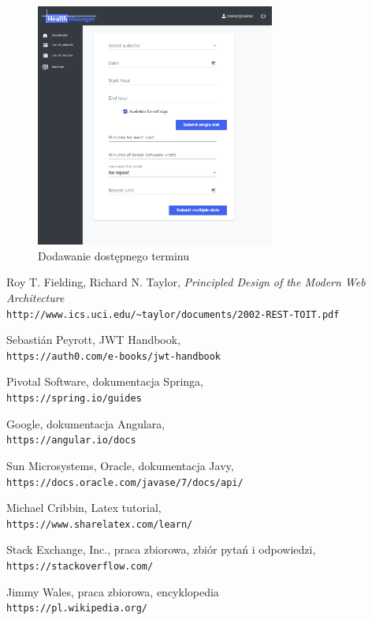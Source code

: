 \documentclass[polish,12pt]{aghthesis}
\begin{document}
{\begin{figure}[H]
          \includegraphics[width=0.7\textwidth]{gui-add-timeslot}
          \caption{Dodawanie dostępnego terminu}
        \end{figure}     
    }
\newpage
\listoffigures 
\newpage



\begin{thebibliography}{9}
Roy T. Fielding, Richard N. Taylor, \emph{Principled Design of the Modern
Web Architecture}
\\\texttt{http://www.ics.uci.edu/\~{}taylor/documents/2002-REST-TOIT.pdf}

Sebastián Peyrott, JWT Handbook, 
\\\texttt{https://auth0.com/e-books/jwt-handbook}

Pivotal Software, dokumentacja Springa, 
\\\texttt{https://spring.io/guides}

Google, dokumentacja Angulara, 
\\\texttt{https://angular.io/docs}

Sun Microsystems, Oracle, dokumentacja Javy, 
\\\texttt{https://docs.oracle.com/javase/7/docs/api/}
 
Michael Cribbin, Latex tutorial,
\\\texttt{https://www.sharelatex.com/learn/}

Stack Exchange, Inc., praca zbiorowa, zbiór pytań i odpowiedzi,
\\\texttt{https://stackoverflow.com/}

Jimmy Wales, praca zbiorowa, encyklopedia
\\\texttt{https://pl.wikipedia.org/}

\end{thebibliography}

%
\end{document}
